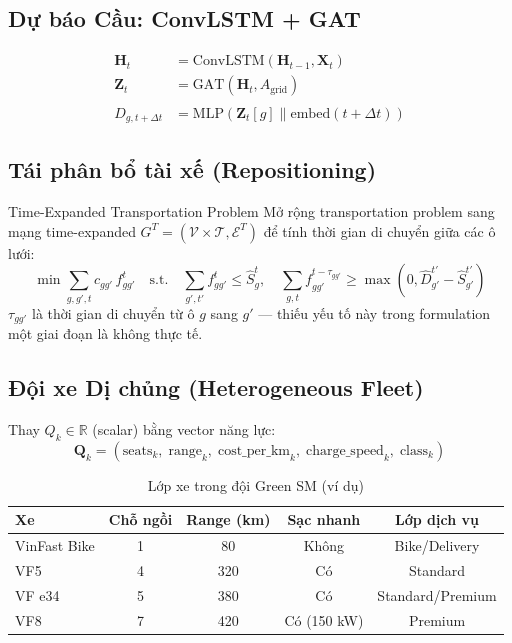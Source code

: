 \documentclass[12pt,a4paper]{article}
\begin{document}
\subsection{Dự báo Cầu: ConvLSTM + GAT}

\begin{align}
  \mathbf{H}_t &= \mathrm{ConvLSTM}(\mathbf{H}_{t-1},\mathbf{X}_t)\\
  \mathbf{Z}_t &= \mathrm{GAT}(\mathbf{H}_t,A_{\mathrm{grid}})\\
  \hat{D}_{g,t+\Delta t} &= \mathrm{MLP}(\mathbf{Z}_t[g]\|\mathrm{embed}(t{+}\Delta t))
\end{align}

\subsection{Tái phân bổ tài xế (Repositioning)}

\begin{definitionbox}{Time-Expanded Transportation Problem}
Mở rộng transportation problem sang mạng time-expanded
$G^T=(\mathcal{V}\times\mathcal{T},\mathcal{E}^T)$ để tính thời gian di chuyển
giữa các ô lưới:
\begin{equation}
  \min\sum_{g,g',t}c_{gg'}\,f_{gg'}^t
  \quad\text{s.t.}\quad
  \sum_{g',t'}f_{gg'}^t\leq\hat{S}_g^t,\quad
  \sum_{g,t}f_{gg'}^{t-\tau_{gg'}}\geq\max(0,\hat{D}_{g'}^{t'}-\hat{S}_{g'}^{t'})
\end{equation}
$\tau_{gg'}$ là thời gian di chuyển từ ô $g$ sang $g'$ --- thiếu yếu tố này
trong formulation một giai đoạn là không thực tế.
\end{definitionbox}

\subsection{Đội xe Dị chủng (Heterogeneous Fleet)}
\label{sec:hetfleet}

Thay $Q_k\in\mathbb{R}$ (scalar) bằng vector năng lực:
\begin{equation}
  \mathbf{Q}_k = (\text{seats}_k,\;\text{range}_k,\;\text{cost\_per\_km}_k,\;
                  \text{charge\_speed}_k,\;\text{class}_k)
\end{equation}

\begin{table}[h!]
\centering
\caption{Lớp xe trong đội Green SM (ví dụ)}
\renewcommand{\arraystretch}{1.2}
\begin{tabular}{lcccc}
\toprule
\textbf{Xe} & \textbf{Chỗ ngồi} & \textbf{Range (km)} & \textbf{Sạc nhanh} & \textbf{Lớp dịch vụ}\\
\midrule
VinFast Bike & 1 & 80 & Không & Bike/Delivery\\
VF5           & 4 & 320 & Có & Standard\\
VF e34        & 5 & 380 & Có & Standard/Premium\\
VF8           & 7 & 420 & Có (150 kW) & Premium\\
\bottomrule
\end{tabular}
\end{table}
\end{document}
